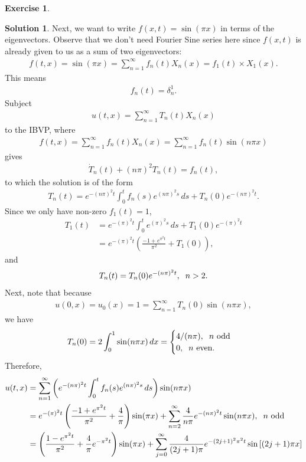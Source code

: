 \documentclass{book}
\theoremstyle{definition}
\newtheorem*{exer*}{Exercise}
\newtheorem*{sln*}{Solution}
\begin{document}
\begin{exer*}
\begin{sln*}
		Next, we want to write $f(x,t) = \sin(\pi x)$ in terms of the eigenvectors. Observe that we don't need Fourier Sine series here since $f(x,t)$ is already given to us as a sum of two eigenvectors:
		\begin{align*}
		f(t,x) = \sin(\pi x) = \sum^\infty_{n=1}f_n(t)X_n(x) = f_1(t) \times X_1(x).
		\end{align*}
		This means
		\begin{align*}
		f_n(t) = \delta^1_n.
		\end{align*}
		Subject 
		\begin{align*}
		u(t,x) = \sum^\infty_{n=1} T_n(t)X_n(x)
		\end{align*}
		to the IBVP, where
		\begin{align*}
		f(t,x) = \sum^\infty_{n=1}f_n(t)X_n(x) = \sum^\infty_{n=1}f_n(t)\sin(n\pi x)
		\end{align*}
		gives
		\begin{align*}
		\dot{T}_n(t) + (n\pi)^2T_n(t) = f_n(t),
		\end{align*}
		to which the solution is of the form
		\begin{align*}
		T_n(t) = e^{-(n\pi)^2t}\int^t_0 f_n(s)e^{(n\pi)^2s}\,ds + T_n(0)e^{-(n\pi)^2t}.
		\end{align*}
		Since we only have non-zero $f_1(t) = 1$, 
		\begin{align*}
		T_1(t) &= e^{-(\pi)^2t}\int^t_0 e^{(\pi)^2s}\,ds + T_1(0)e^{-(\pi)^2t}\\
		&= e^{-(\pi)^2t}\left(\frac{-1 + e^{\pi^2t}}{\pi^2}  + T_1(0)\right),
		\end{align*}
		and
		\begin{align*}
		T_n(t) = T_n(0)e^{-(n\pi)^2t}, \hspace{0.2cm}n > 2.
		\end{align*}
		Next, note that because 
		\begin{align*}
		u(0,x) = u_0(x) = 1 = \sum^\infty_{n=1}T_n(0)\sin(n\pi x),
		\end{align*}
		we have
		\begin{align*}
		T_n(0) = 2\int^1_0  \sin(n \pi x)\,dx = \begin{cases}
		4/(n\pi), \hspace{0.2cm}n \text{ odd}\\
		0, \hspace{0.2cm}n \text{ even}.
		\end{cases}
		\end{align*}
		Therefore, 
		\begin{align*}
		u(t,x) &= \sum^\infty_{n=1}\left( e^{-(n\pi)^2t}\int^t_0 f_n(s)e^{(n\pi)^2s}\,ds \right)\sin(n\pi x)\\
		&= e^{-(\pi)^2t}\left(\frac{-1 + e^{\pi^2t}}{\pi^2} + \frac{4}{\pi}\right)\sin(\pi x) + \sum^\infty_{n=2}\frac{4}{n\pi}e^{-(n\pi)^2t}\sin(n\pi x),\hspace{0.2cm}n \text{ odd}\\
		&= \left(\frac{1-e^{\pi^2t}}{\pi^2} + \frac{4}{\pi}e^{-\pi^2t}\right)\sin(\pi x) + \sum^\infty_{j=0}\frac{4}{(2j+1)\pi}e^{-(2j+1)^2\pi^2t}\sin\left[(2j+1)\pi x\right]
		\end{align*}
		

\end{sln*}
\end{exer*}
\end{document}
